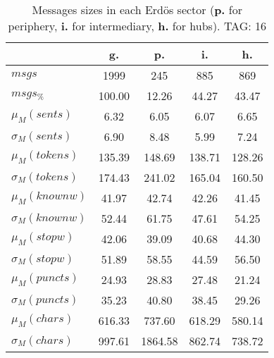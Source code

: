 \begin{table}[h!]
\begin{center}
\begin{tabular}{| l || c | c | c | c |}\hline
 & {\bf g.} & {\bf p.} & {\bf i.} & {\bf h.} \\\hline\hline
$msgs$ & 1999  & 245  & 885  & 869 \\
$msgs_{\%}$ & 100.00  & 12.26  & 44.27  & 43.47 \\\hline
$\mu_M(sents)$ & 6.32  & 6.05  & 6.07  & 6.65 \\
$\sigma_M(sents)$ & 6.90  & 8.48  & 5.99  & 7.24 \\\hline
$\mu_M(tokens)$ & 135.39  & 148.69  & 138.71  & 128.26 \\
$\sigma_M(tokens)$ & 174.43  & 241.02  & 165.04  & 160.50 \\\hline
$\mu_M(knownw)$ & 41.97  & 42.74  & 42.26  & 41.45 \\
$\sigma_M(knownw)$ & 52.44  & 61.75  & 47.61  & 54.25 \\\hline
$\mu_M(stopw)$ & 42.06  & 39.09  & 40.68  & 44.30 \\
$\sigma_M(stopw)$ & 51.89  & 58.55  & 44.59  & 56.50 \\\hline
$\mu_M(puncts)$ & 24.93  & 28.83  & 27.48  & 21.24 \\
$\sigma_M(puncts)$ & 35.23  & 40.80  & 38.45  & 29.26 \\\hline
$\mu_M(chars)$ & 616.33  & 737.60  & 618.29  & 580.14 \\
$\sigma_M(chars)$ & 997.61  & 1864.58  & 862.74  & 738.72 \\\hline
\end{tabular}
\caption{Messages sizes in each Erd\"os sector ({{\bf p.}} for periphery, {{\bf i.}} for intermediary, {{\bf h.}} for hubs). TAG: 16}
\end{center}
\end{table}